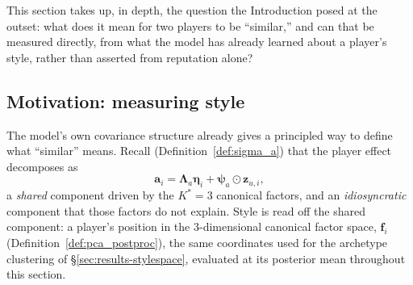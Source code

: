 This section takes up, in depth, the question the Introduction posed at the outset: what does it mean for two
players to be ``similar,'' and can that be measured directly, from what the model has already learned about a
player's style, rather than asserted from reputation alone?

\subsection{Motivation: measuring style}

The model's own covariance structure already gives a principled way to define what ``similar'' means. Recall
(Definition~\ref{def:sigma_a}) that the player effect decomposes as
\[
\mathbf a_i = \boldsymbol\Lambda_a\boldsymbol\eta_i + \boldsymbol\psi_a \odot \mathbf z_{u,i},
\]
a \emph{shared} component driven by the $K^*=3$ canonical factors, and an \emph{idiosyncratic} component that
those factors do not explain. Style is read off the shared component: a player's position in the
$3$-dimensional canonical factor space, $\mathbf f_i$ (Definition~\ref{def:pca_postproc}), the same coordinates
used for the archetype clustering of \S\ref{sec:results-stylespace}, evaluated at its posterior mean throughout
this section.

